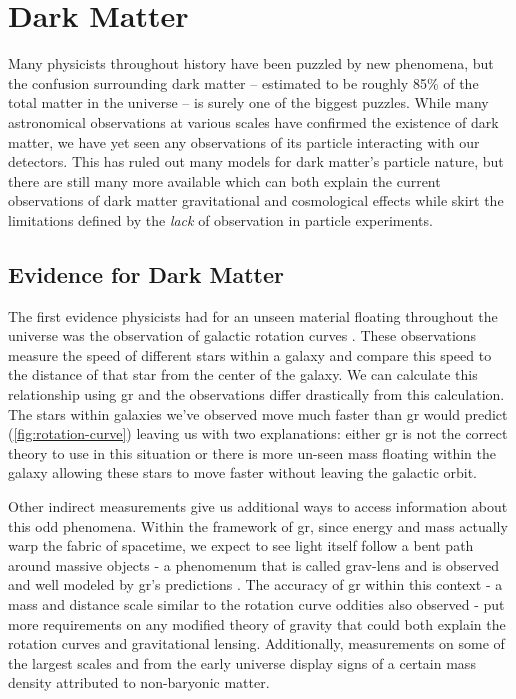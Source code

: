 \chapter{Dark Matter}
\label{chapter:dm}

Many physicists throughout history have been puzzled by new phenomena, but the
confusion surrounding dark matter -- estimated to be roughly 85\% of the total
matter in the universe -- is surely one of the biggest puzzles. While many
astronomical observations at various scales have confirmed the existence of
dark matter, we have yet seen any observations of its particle interacting
with our detectors. This has ruled out many models for dark matter's particle
nature, but there are still many more available which can both explain the
current observations of dark matter gravitational and cosmological effects
while skirt the limitations defined by the \emph{lack} of observation in
particle experiments.

\section{Evidence for Dark Matter}

The first evidence physicists had for an unseen material floating throughout the universe
was the observation of galactic rotation curves \cite{rubin-rotationcurve-1980,rotationcurve-2000}.
These observations measure the speed of different stars within a galaxy and compare this speed to
the distance of that star from the center of the galaxy. We can calculate this relationship
using \gls{gr} \cite{rotationcurve-predictions-2007} and the
observations differ drastically from this calculation. The stars within galaxies we've observed move
much faster than \gls{gr} would predict (\cref{fig:rotation-curve}) leaving us with two explanations: either \gls{gr} is not the correct theory
to use in this situation or there is more un-seen mass floating within the galaxy allowing these stars
to move faster without leaving the galactic orbit.

Other indirect measurements give us additional ways to access information about this odd phenomena.
Within the framework of \gls{gr}, since energy and mass actually warp the fabric of spacetime,
we expect to see light itself follow a bent path around massive objects - a phenomenum that is called
\gls{grav-lens} and is observed and well modeled by \gls{gr}'s predictions \cite{gravlensing-2004}.
The accuracy of \gls{gr} within this context - a mass and distance scale similar to the rotation curve oddities also observed -
put more requirements on any modified theory of gravity that could both explain the rotation curves and gravitational lensing.
Additionally, measurements on some of the largest scales and from the early universe
display signs of a certain mass density attributed to non-baryonic matter.

